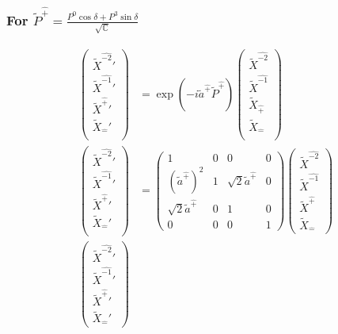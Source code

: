 \documentclass[]{article}
\numberwithin{equation}{section}
\begin{document}
{{\subsubsection{For $ \tilde{P}^{\hat{+}}=\frac{P^0\cos{\delta}+P^3\sin{\delta}}{\sqrt{\mathbb{C}}}$}
\begin{align}
\begin{pmatrix}
    \tilde{X}^{\hat{-2}}'\\
    \tilde{X}^{\hat{-1}}'\\
    \tilde{X}^{\hat{+}}'\\
    \tilde{X}_{\hat{-}}'\\
    \end{pmatrix}&= \exp{(-i\tilde{a}^{\hat{+}}\tilde{P}^{\hat{+}})}\begin{pmatrix}
    \tilde{X}^{\hat{-2}}\\
    \tilde{X}^{\hat{-1}}\\
    \tilde{X}_{\hat{+}}\\
    \tilde{X}_{\hat{-}}\\
    \end{pmatrix}\\
    \begin{pmatrix}
    \tilde{X}^{\hat{-2}}'\\
    \tilde{X}^{\hat{-1}}'\\
    \tilde{X}^{\hat{+}}'\\
    \tilde{X}_{\hat{-}}'\\
    \end{pmatrix}&= \begin{pmatrix}
        1&0&0&0\\
        (\tilde{a}^{\hat{+}})^2&1&\sqrt{2}\tilde{a}^{\hat{+}}&0\\
        \sqrt{2}\tilde{a}^{\hat{+}}&0&1&0\\
        0&0&0&1
    \end{pmatrix}\begin{pmatrix}
    \tilde{X}^{\hat{-2}}\\
    \tilde{X}^{\hat{-1}}\\
    \tilde{X}^{\hat{+}}\\
    \tilde{X}_{\hat{-}}
    \end{pmatrix}\\
    \begin{pmatrix}
    \tilde{X}^{\hat{-2}}'\\
    \tilde{X}^{\hat{-1}}'\\
    \tilde{X}^{\hat{+}}'\\
    \tilde{X}_{\hat{-}}'

\end{pmatrix}
\end{align}}}
\end{document}
